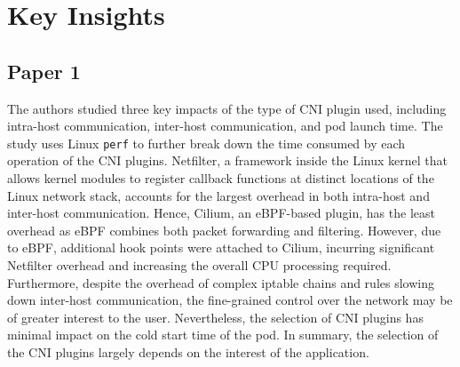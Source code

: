 \section{Key Insights}%
\label{sec:Key Insights}
\subsection{Paper 1}%
\label{sub:Paper 1}
The authors studied three key impacts of the type of CNI plugin used, including intra-host communication, inter-host communication, and pod launch time.  
The study uses Linux \texttt{perf} to further break down the time consumed by each operation of the CNI plugins.  
Netfilter, a framework inside the Linux kernel that allows kernel modules to register callback functions at distinct locations of the Linux network stack, accounts for the largest overhead in both intra-host and inter-host communication.  
Hence, Cilium, an eBPF-based plugin, has the least overhead as eBPF combines both packet forwarding and filtering.  
However, due to eBPF, additional hook points were attached to Cilium, incurring significant Netfilter overhead and increasing the overall CPU processing required.  
Furthermore, despite the overhead of complex iptable chains and rules slowing down inter-host communication, the fine-grained control over the network may be of greater interest to the user.  
Nevertheless, the selection of CNI plugins has minimal impact on the cold start time of the pod.  
In summary, the selection of the CNI plugins largely depends on the interest of the application.









